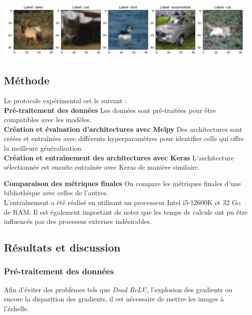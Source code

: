 \begin{multicols}{2}
\includegraphics[width=\columnwidth]{images/cifar10_samples.png}
\hfill\break

\subsection{Méthode}

Le protocole expérimental est le suivant :  \\


\textbf{Pré-traitement des données} Les données sont pré-traitées 
pour être compatibles avec les modèles.\\

\textbf{Création et évaluation d’architectures avec Melpy} Des architectures sont créées 
et entraînées avec différents hyperparamètres pour identifier celle qui offre 
la meilleure généralisation.\\

\textbf{Création et entraînement des architectures avec Keras} L'architecture
sélectionnée est ensuite entraînée avec Keras de manière similaire.


\textbf{Comparaison des métriques finales} On compare les métriques finales d'une bibliothèque
avec celles de l'autres. \\

L’entraînement a été réalisé en utilisant un processeur Intel i5-12600K et 32 Go de RAM. Il
est également important de noter que les temps de calculs ont pu être influencés par des processus 
externes indésirables.


\subsection{Résultats et discussion}

\subsubsection{Pré-traitement des données}

Afin d’éviter des problèmes tels que \textit{Dead ReLU}, l’explosion des gradients 
ou encore la disparition des gradients, il est nécessaire de mettre les images à l’échelle.\\


\end{multicols}
